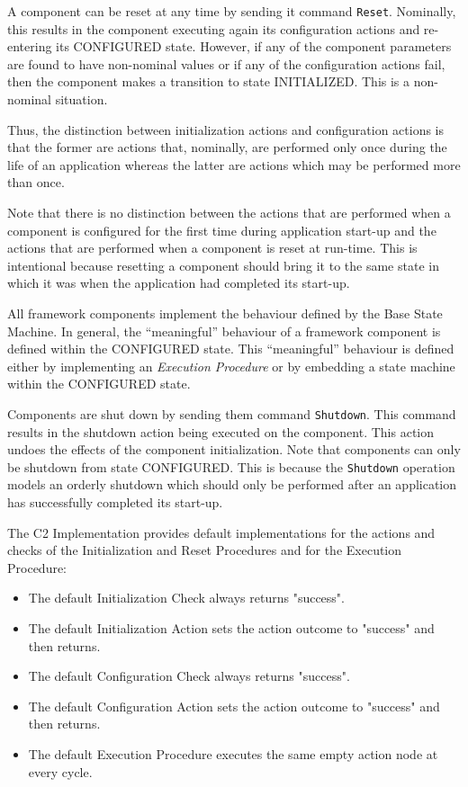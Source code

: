 \documentclass{pnp_article}
\begin{document}
A component can be reset at any time by sending it command \texttt{Reset}. Nominally, this results in the component executing again its configuration actions and re-entering its CONFIGURED state. However, if any of the component parameters are found to have non-nominal values or if any of the configuration actions fail, then the component makes a transition to state INITIALIZED. This is a non-nominal situation.

Thus, the distinction between initialization actions and configuration actions is that the former are actions that, nominally, are performed only once during the life of an application whereas the latter are actions which may be performed more than once.

Note that there is no distinction between the actions that are performed when a component is configured for the first time during application start-up and the actions that are performed when a component is reset at run-time. This is intentional because resetting a component should bring it to the same state in which it was when the application had completed its start-up.

All framework components implement the behaviour defined by the Base State Machine. In general, the “meaningful” behaviour of a framework component is defined within the CONFIGURED state. This “meaningful” behaviour is defined either by implementing an \textit{Execution Procedure} or by embedding a state machine within the CONFIGURED state.

Components are shut down by sending them command \texttt{Shutdown}. This command results in the shutdown action being executed on the component. This action undoes the effects of the component initialization. Note that components can only be shutdown from state CONFIGURED. This is because the \texttt{Shutdown} operation models an orderly shutdown which should only be performed after an application has successfully completed its start-up. 

The C2 Implementation provides default implementations for the actions and checks of the Initialization and Reset Procedures and for the Execution Procedure:

\begin{itemize}
\item The default Initialization Check always returns "success".
\item The default Initialization Action sets the action outcome to "success" and then returns.
\item The default Configuration Check always returns "success".
\item The default Configuration Action sets the action outcome to "success" and then returns.
\item The default Execution Procedure executes the same empty action node at every cycle.
\end{itemize}
\end{document}
